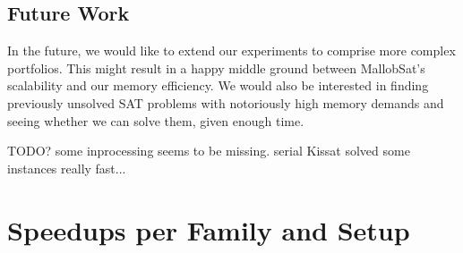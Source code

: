 \documentclass[12pt,a4paper,twoside]{scrartcl}
\numberwithin{equation}{section}
\begin{document}
\subsection{Future Work}

In the future, we would like to extend our experiments to comprise more complex portfolios. This might result in a happy middle ground between MallobSat's scalability and our memory efficiency. We would also be interested in finding previously unsolved SAT problems with notoriously high memory demands and seeing whether we can solve them, given enough time.

TODO? some inprocessing seems to be missing. serial Kissat solved some instances really fast...


\clearpage


\appendix

\section{Speedups per Family and Setup}
\label{app:speedupsFamiliesComplete}
\end{document}
